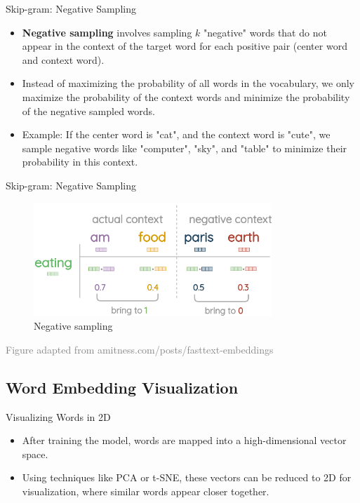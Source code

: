 \documentclass[serif, aspectratio=169]{beamer}
\begin{document}
\begin{frame}{Skip-gram: Negative Sampling}
    \begin{itemize}
        \item \textbf{Negative sampling} involves sampling \(k\) "negative" words that do not appear in the context of the target word for each positive pair (center word and context word).
        \item Instead of maximizing the probability of all words in the vocabulary, we only maximize the probability of the context words and minimize the probability of the negative sampled words.
        \item Example: If the center word is "cat", and the context word is "cute", we sample negative words like "computer", "sky", and "table" to minimize their probability in this context.
    \end{itemize}
\end{frame}

\begin{frame}{Skip-gram: Negative Sampling}
	\begin{figure}
		\centering
		\includegraphics[width=0.8\textwidth]{pic/skip_negative.png}
		\caption*{Negative sampling}
	\end{figure}
	\vspace{0.1cm}
	\hspace{-1.0cm}
	{\tiny \textcolor{gray}{Figure adapted from amitness.com/posts/fasttext-embeddings}}
\end{frame}




\subsection{Word Embedding Visualization}

\begin{frame}{Visualizing Words in 2D}
    \begin{itemize}
        \item After training the model, words are mapped into a high-dimensional vector space.
        \item Using techniques like PCA or t-SNE, these vectors can be reduced to 2D for visualization, where similar words appear closer together.
    \end{itemize}
\end{frame}
\end{document}
